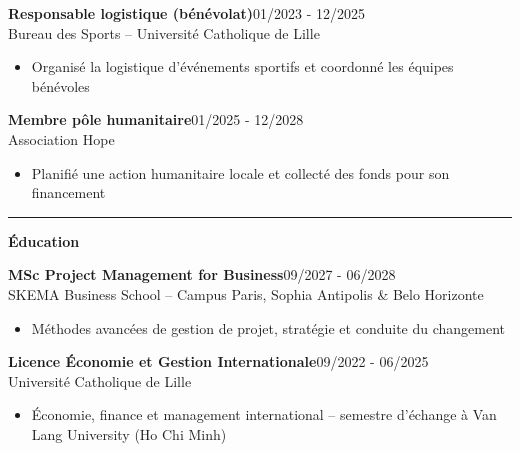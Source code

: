 \documentclass[a4paper]{article}
\renewcommand{\colorbox}[2]{#2}%
\newcommand{\fullrule}{\hspace{-1.5cm}\rule{\paperwidth}{0.4pt}}
\newcommand{\cvsection}[1]{%
  \vspace{6pt}\textbf{\Large #1}\par\vspace{2pt}}
\begin{document}
\vspace{3mm}

\colorbox{maincolor}{%
  \begin{minipage}{\linewidth}
    \noindent
    \textbf{Responsable logistique (bénévolat)}\hfill 01/2023 - 12/2025\\
    Bureau des Sports – Université Catholique de Lille\\[-0.3em]
    \begin{itemize}[leftmargin=*]
      \item Organisé la logistique d’événements sportifs et coordonné les équipes bénévoles
    \end{itemize}
  \end{minipage}}

\vspace{3mm}

\colorbox{maincolor}{%
  \begin{minipage}{\linewidth}
    \noindent
    \textbf{Membre pôle humanitaire}\hfill 01/2025 - 12/2028\\
    Association Hope\\[-0.3em]
    \begin{itemize}[leftmargin=*]
      \item Planifié une action humanitaire locale et collecté des fonds pour son financement
    \end{itemize}
  \end{minipage}}

\medskip\fullrule

\cvsection{Éducation}
\vspace{0.3cm}

\colorbox{maincolor}{%
  \begin{minipage}{\linewidth}
    \noindent
    \textbf{MSc Project Management for Business}\hfill 09/2027 - 06/2028\\
    SKEMA Business School – Campus Paris, Sophia Antipolis \& Belo Horizonte\\[-0.3em]
    \begin{itemize}[leftmargin=*]
      \item Méthodes avancées de gestion de projet, stratégie et conduite du changement
    \end{itemize}
  \end{minipage}}

\vspace{3mm}

\colorbox{maincolor}{%
  \begin{minipage}{\linewidth}
    \noindent
    \textbf{Licence Économie et Gestion Internationale}\hfill 09/2022 - 06/2025\\
    Université Catholique de Lille\\[-0.3em]
    \begin{itemize}[leftmargin=*]
      \item Économie, finance et management international – semestre d’échange à Van Lang University (Ho Chi Minh)
    \end{itemize}
  \end{minipage}}
\end{document}
